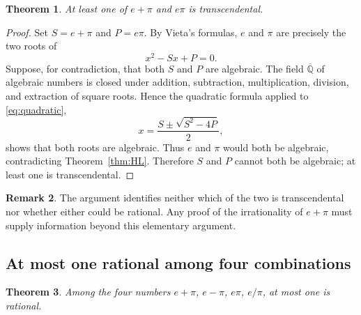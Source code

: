 \documentclass[11pt]{amsart}
\newtheorem{theorem}{Theorem}[section]
\theoremstyle{definition}
\newtheorem{remark}[theorem]{Remark}
\theoremstyle{remark}
\numberwithin{equation}{section}
\newcommand{\Qbar}{\overline{\mathbb{Q}}}
\begin{document}
\begin{theorem}\label{thm:vieta}
At least one of $e+\pi$ and $e\pi$ is transcendental.
\end{theorem}

\begin{proof}
Set $S=e+\pi$ and $P=e\pi$. By Vieta's formulas, $e$ and $\pi$ are precisely the two roots of
\begin{equation}\label{eq:quadratic}
x^2-Sx+P=0.
\end{equation}
Suppose, for contradiction, that both $S$ and $P$ are algebraic. The field $\Qbar$ of algebraic numbers is closed under addition, subtraction, multiplication, division, and extraction of square roots. Hence the quadratic formula applied to \eqref{eq:quadratic},
\[
x=\frac{S\pm\sqrt{S^2-4P}}{2},
\]
shows that both roots are algebraic. Thus $e$ and $\pi$ would both be algebraic, contradicting Theorem~\ref{thm:HL}. Therefore $S$ and $P$ cannot both be algebraic; at least one is transcendental.
\end{proof}

\begin{remark}
The argument identifies neither which of the two is transcendental nor whether either could be rational. Any proof of the irrationality of $e+\pi$ must supply information beyond this elementary argument.
\end{remark}

\subsection{At most one rational among four combinations}

\begin{theorem}\label{thm:four}
Among the four numbers $e+\pi$, $e-\pi$, $e\pi$, $e/\pi$, at most one is rational.
\end{theorem}
\end{document}
